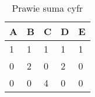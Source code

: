 \begin{table}[htbp]
\centering
\begin{tabular}{|l|l|l|l|l|}
\hline
\rowcolor[HTML]{96FFFB} 
\textbf{A} & \textbf{B} & \textbf{C} & \textbf{D} & \textbf{E} \\ \hline
    1      &      1     &     1      &     1      &      1     \\ \hline
     0     &      2     &      0     &     2      &      0     \\ \hline
     0     &      0     &      4     &     0      &      0     \\ \hline
\end{tabular}
\caption{Prawie suma cyfr}
\label{tab:sum}
\end{table}